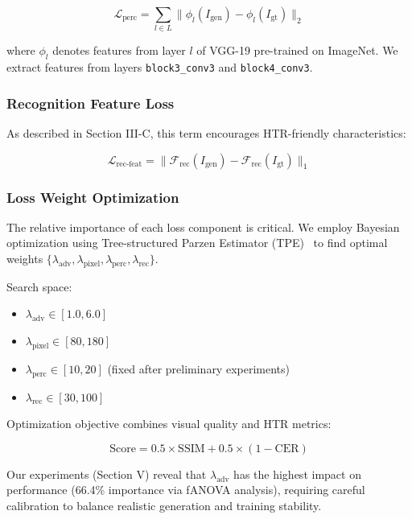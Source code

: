 \documentclass[journal]{IEEEtran}
\begin{document}
\begin{equation}
\mathcal{L}_{\text{perc}} = \sum_{l \in L} \|\phi_l(I_{\text{gen}}) - \phi_l(I_{\text{gt}})\|_2
\end{equation}

where $\phi_l$ denotes features from layer $l$ of VGG-19 pre-trained on ImageNet. We extract features from layers \texttt{block3\_conv3} and \texttt{block4\_conv3}.

\subsubsection{Recognition Feature Loss}

As described in Section III-C, this term encourages HTR-friendly characteristics:

\begin{equation}
\mathcal{L}_{\text{rec-feat}} = \|\mathcal{F}_{\text{rec}}(I_{\text{gen}}) - \mathcal{F}_{\text{rec}}(I_{\text{gt}})\|_1
\end{equation}

\subsubsection{Loss Weight Optimization}

The relative importance of each loss component is critical. We employ Bayesian optimization using Tree-structured Parzen Estimator (TPE)~\cite{bergstra2011algorithms} to find optimal weights $\{\lambda_{\text{adv}}, \lambda_{\text{pixel}}, \lambda_{\text{perc}}, \lambda_{\text{rec}}\}$.

Search space:
\begin{itemize}
    \item $\lambda_{\text{adv}} \in [1.0, 6.0]$
    \item $\lambda_{\text{pixel}} \in [80, 180]$
    \item $\lambda_{\text{perc}} \in [10, 20]$ (fixed after preliminary experiments)
    \item $\lambda_{\text{rec}} \in [30, 100]$
\end{itemize}

Optimization objective combines visual quality and HTR metrics:

\begin{equation}
\text{Score} = 0.5 \times \text{SSIM} + 0.5 \times (1 - \text{CER})
\end{equation}

Our experiments (Section V) reveal that $\lambda_{\text{adv}}$ has the highest impact on performance (66.4\% importance via fANOVA analysis), requiring careful calibration to balance realistic generation and training stability.
\end{document}
